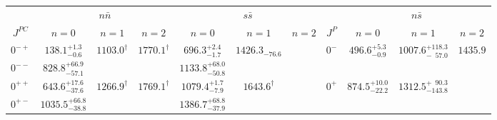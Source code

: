 \begin{table}[!th]
\renewcommand{\arraystretch}{1.3}
\begin{tabular}{c|ccc|ccc||c|ccc}
\hline
\hline
                            & \multicolumn{3}{c|}{$n\bar{n}   $}                                                         & \multicolumn{3}{c||}{$s\bar{s}$}                                           &          & \multicolumn{3}{c}{$n\bar{s}$}  \\
$J^{PC}$                    & $n=0$                                &   $n=1$                            &          $n=2$ & $n=0$                     &   $n=1$                   &          $n=2$    &  $J^P   $&  $n=0$    &$n=1$  & $n=2$ \\
\hline                                                                                                                                                                                                     
$0^{-+}$                    & $138.1^{+1.3}_{-0.6}$                &   $1103.0^\dag$                    &  $1770.1^\dag$ &  $696.3^{+2.4}_{-1.7}$    &  $1426.3_{-76.6}$         &                   &  \multirow{2}{*}{$0^-$}       &   \multirow{2}{*}{ $496.6^{+5.3}_{-0.9}$} &  \multirow{2}{*}{$1007.6^{+118.3}_{-\phantom{1}57.0}$ } & \multirow{2}{*}{$1435.9$} \\                                                                                                                                                                        
$0^{--}$                    & $828.8^{+66.9}_{-57.1}$              &                                    &                &  $1133.8^{+68.0}_{-50.8}$ &                           &                   &         &     & & \\
$0^{++}$                    & $643.6^{+17.6}_{-37.6}$              &   $1266.9^\dag$                    &  $1769.1^\dag$ &  $1079.4^{+1.7}_{-7.9}$   &  $1643.6^\dag$            &                   &  \multirow{2}{*}{$0^+$}       &  \multirow{2}{*}{ $874.5^{+10.0}_{-22.2}$ } &  \multirow{2}{*}{$1312.5^{+\phantom{1}90.3}_{-143.8}$} & \multirow{2}{*}{} \\                                                                                                                                                                        
$0^{+-}$                    & $1035.5^{+66.8}_{-38.8}$             &                                    &                &  $1386.7^{+68.8}_{-37.9}$ &                           &                   &         &     & & \\

\end{tabular}
\end{table}

